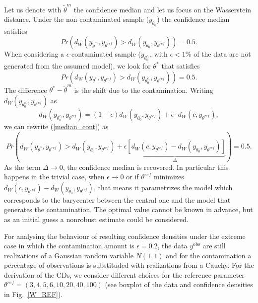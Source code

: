 \documentclass[preprint,12pt,authoryear]{elsarticle}
\begin{document}
Let us denote with  $\tilde\theta^m$ the confidence median and let us focus on the Wasserstein distance. Under  the non contaminated sample ($y_{\theta_0}$) the confidence median satisfies
$$
Pr( d_W(y_{\tilde \theta^m}, y_{\theta^{ref}})>d_W(y_{\theta_0}, y_{\theta^{ref}}))=0.5. 
$$
When considering a $\epsilon$-contaminated sample ($y_{\theta_0^{  c_\epsilon}}$, with $\epsilon<1$\% of the data are not generated from the assumed model), we look for $	\theta^*$ that satisfies
\begin{equation}
Pr( d_W(y_{\theta^*}, y_{\theta^{ref}})>d_W(y_{\theta_0^{c_\epsilon}}, y_{\theta^{ref}}))=0.5. \label{median_cont} 
\end{equation}
The difference $\theta^*-\tilde\theta^m$ is the shift due to the contamination.
Writing  $d_W(y_{\theta_0^{c_\epsilon}},  y_{\theta^{ref}})$ as 
$$  
d_W(y_{\theta_0^{c_\epsilon}},  y_{\theta^{ref}})= (1-\epsilon) d_W(y_{\theta_0}, y_{\theta^{ref}}) + \epsilon \cdot d_W( c,  y_{\theta^{ref}}),  
$$
we can rewrite (\ref{median_cont}) as
$$
Pr \left( d_W(y_{  \theta^*}, y_{\theta^{ref}}) >  d_W(y_{\theta_0}, y_{\theta^{ref}}) +\underbrace{\epsilon[  d_W(c , y_{\theta^{ref}})- d_W(y_{\theta_0}, y_{\theta^{ref}}) ]}_{\Delta} \right)=  0.5.
$$
 As the term $\Delta\rightarrow0$, the confidence median is recovered. In particular this happens in the trivial case, when $\epsilon\rightarrow 0$ or if $\theta^{ref}$   minimizes $ d_W( c , y_{\theta^{ref}})- d_W(y_{\theta_0},y_{\theta^{ref}})$, that means it parametrizes the model which corresponds to the barycenter between the   central one and the model that generates the contamination.
The optimal value cannot be known in advance, but as an initial guess a nonrobust estimate could be considered.

For analysing the behaviour of resulting confidence densities under the extreme case in which the contamination amount is $\epsilon=0.2$,  the data  $y^{\text{obs}}$ are still realizations of a Gaussian random variable $N(1,1)$ and for the contamination a percentage of observations is substituded with realizations from a Cauchy. For the derivation of the CDs, we consider different choices for the reference parameter $\theta^{ref}=(3,4,5,6,10,20,40,100)$ (see boxplot of the data and confidence densities in Fig.\ \ref{W_REF}).
\end{document}
